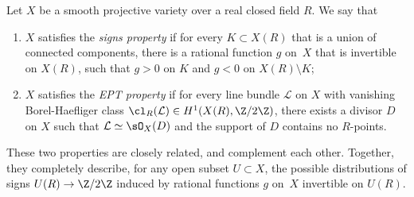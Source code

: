 \label{subsubsec:signsEPT}

\begin{defn}
Let $X$ be a smooth projective variety over a real closed field $R$. We say that
\begin{enumerate}
\item $X$ satisfies the \textit{signs property} if for every $K\subset X(R)$ that is a union of connected components, there is a rational function $g$ on~$X$ that is invertible on $X(R)$, such that $g>0$ on $K$ and $g<0$ on $X(R)\setminus K$;
\item $X$ satisfies the \textit{EPT property} if for every line bundle $\mathcal{L}$ on $X$ with vanishing Borel-Haefliger class $\cl_R(\mathcal{L})\in H^1(X(R),\Z/2\Z)$, there exists a divisor $D$ on $X$ such that $\mathcal{L}\simeq\sO_X(D)$ and the support of $D$ contains no $R$-points.
\end{enumerate}
\end{defn}

These two properties are closely related, and complement each other. Together, they completely describe, for any open subset $U\subset X$, the possible distributions of signs $U(R)\to \Z/2\Z$ induced by rational functions $g$ on~$X$ invertible on $U(R)$.
